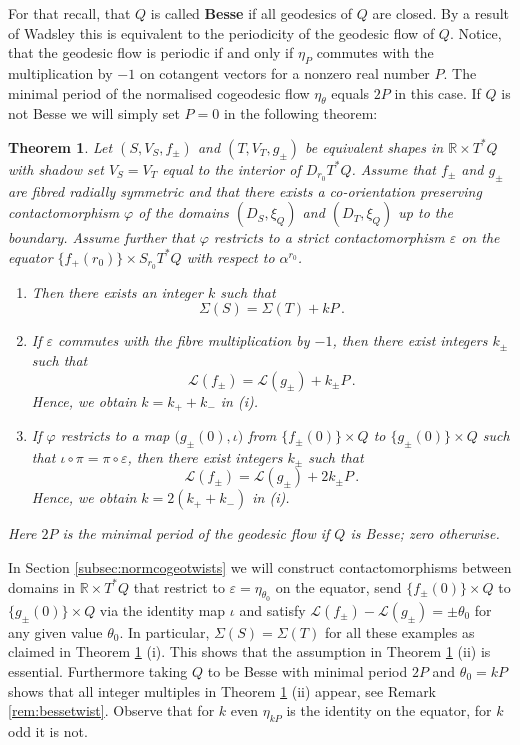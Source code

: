 \documentclass{amsart}
\newtheorem{thmintr}{Theorem}
\theoremstyle{definition}
\newcommand{\LLL}{\mathscr L}
\newcommand{\R}{\mathbb R}
\begin{document}
For that recall,
that $Q$ is called {\bf Besse}
if all geodesics of $Q$ are closed.
By a result of Wadsley \cite{wad75}
this is equivalent
to the periodicity of the geodesic flow of $Q$.
Notice,
that the geodesic flow is periodic if and only if
$\eta_P$ commutes with the multiplication by $-1$
on cotangent vectors for a nonzero real number $P$.
The minimal period of the normalised cogeodesic flow $\eta_{\theta}$
equals $2P$ in this case.
If $Q$ is not Besse we will simply set $P=0$
in the following theorem:


\begin{thmintr}
\label{thmintr:cobocotangentobstr}
Let $(S,V_S,f_{\pm})$ and $(T,V_T,g_{\pm})$
be equivalent shapes in $\R\times T^*Q$
with shadow set $V_S=V_T$
equal to the interior of $D_{r_0}T^*Q$.
Assume that $f_{\pm}$ and $g_{\pm}$
are fibred radially symmetric
and that there exists a co-orientation preserving
contactomorphism $\varphi$ of the domains
$(D_S,\xi_Q)$ and $(D_T,\xi_Q)$
up to the boundary.
Assume further that
$\varphi$ restricts to a strict contactomorphism
$\varepsilon$ on the equator $\{f_+(r_0)\}\times S_{r_0}T^*Q$
with respect to $\alpha^{r_0}$.
  	\begin{enumerate}
 	\item[(i)]
	Then there exists an integer $k$
	such that
	\[
	\Sigma(S)=\Sigma(T)+kP
	\,.
	\]
 	\item[(ii)]
	If $\varepsilon$	commutes with the fibre multiplication by $-1$,
	then there exist integers $k_{\pm}$ such that
	\[
	\LLL(f_{\pm})=\LLL(g_{\pm})+k_{\pm}P
	\,.
	\]
	Hence, we obtain $k=k_++k_-$ in (i).
 	\item[(iii)]
	If $\varphi$ restricts to a map
	$\big(g_{\pm}(0),\iota\big)$ from
	$\{f_{\pm}(0)\}\times Q$ to $\{g_{\pm}(0)\}\times Q$
	such that $\iota\circ\pi=\pi\circ\varepsilon$,  
	then there exist integers $k_{\pm}$ such that
	\[
	\LLL(f_{\pm})=\LLL(g_{\pm})+2k_{\pm}P
	\,.
	\]
	Hence, we obtain $k=2(k_++k_-)$ in (i).
  	\end{enumerate}
Here $2P$ is the minimal period
of the geodesic flow if $Q$ is Besse;
zero otherwise.
\end{thmintr}


In Section \ref{subsec:normcogeotwists}
we will construct contactomorphisms
between domains in $\R\times T^*Q$
that restrict to $\varepsilon=\eta_{\theta_0}$ on the equator,
send $\{f_{\pm}(0)\}\times Q$
to $\{g_{\pm}(0)\}\times Q$ via the identity map $\iota$
and satisfy $\LLL(f_{\pm})-\LLL(g_{\pm})=\pm\theta_0$
for any given value $\theta_0$.
In particular,
$\Sigma(S)=\Sigma(T)$ for all these examples
as claimed in Theorem \ref{thmintr:cobocotangentobstr} (i).
This shows that the assumption
in Theorem \ref{thmintr:cobocotangentobstr} (ii)
is essential.
Furthermore
taking $Q$ to be Besse with minimal period $2P$
and $\theta_0=kP$ shows that all integer multiples
in Theorem \ref{thmintr:cobocotangentobstr} (ii)
appear, see Remark \ref{rem:bessetwist}.
Observe that for $k$ even
$\eta_{kP}$ is the identity on the equator,
for $k$ odd it is not.
\end{document}
